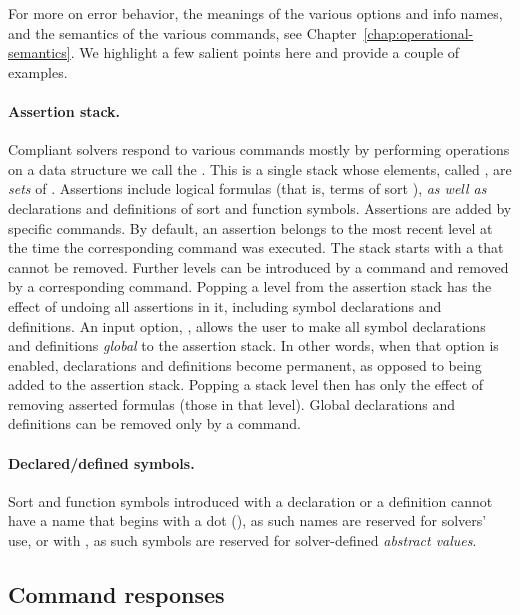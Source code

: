 For more on error behavior, the meanings of the various options and info names,
and the semantics of the various commands, 
see Chapter~\ref{chap:operational-semantics}.
We highlight a few salient points here and provide a couple of examples.


\paragraph{Assertion stack.} 
Compliant solvers respond to various commands mostly by performing operations 
on a data structure we call the .  
This is a single stack whose elements, called ,
are \emph{sets} of . 
Assertions include logical formulas (that is, terms of sort ), 
\emph{as well as} declarations and definitions of sort and function symbols.
Assertions are added by specific commands.
By default, an assertion belongs to the most recent level
at the time the corresponding command was executed.
The stack starts with a  
that cannot be removed.
Further levels can be introduced by a  command and 
removed by a corresponding  command.
Popping a level from the assertion stack has the effect of undoing 
all assertions in it, including symbol declarations and definitions.
An input option, , allows the user to make 
all symbol declarations and definitions \emph{global} to the assertion stack.
In other words, when that option is enabled, declarations and definitions become
permanent, as opposed to being added to the assertion stack.
Popping a stack level then has only the effect of removing asserted formulas 
(those in that level).
Global declarations and definitions can be removed only by a  command.

\paragraph{Declared/defined symbols.}
Sort and function symbols introduced with a declaration or a definition
cannot have a name that begins with a dot (), as such names 
are reserved for solvers' use, or with , as such symbols are reserved 
for solver-defined \emph{abstract values}.

\subsection{Command responses}

